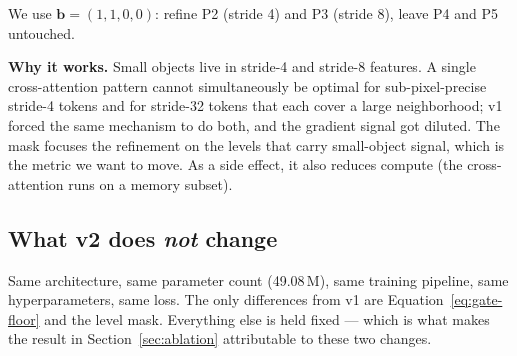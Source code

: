 We use $\mathbf{b} = (1, 1, 0, 0)$: refine P2 (stride 4) and P3 (stride 8), leave P4 and P5 untouched.

\noindent\textbf{Why it works.} Small objects live in stride-4 and stride-8 features. A single cross-attention pattern cannot simultaneously be optimal for sub-pixel-precise stride-4 tokens and for stride-32 tokens that each cover a large neighborhood; v1 forced the same mechanism to do both, and the gradient signal got diluted. The mask focuses the refinement on the levels that carry small-object signal, which is the metric we want to move. As a side effect, it also reduces compute (the cross-attention runs on a memory subset).

\subsection{What v2 does \emph{not} change}

Same architecture, same parameter count (49.08\,M), same training pipeline, same hyperparameters, same loss. The only differences from v1 are Equation~\ref{eq:gate-floor} and the level mask. Everything else is held fixed --- which is what makes the result in Section~\ref{sec:ablation} attributable to these two changes.
